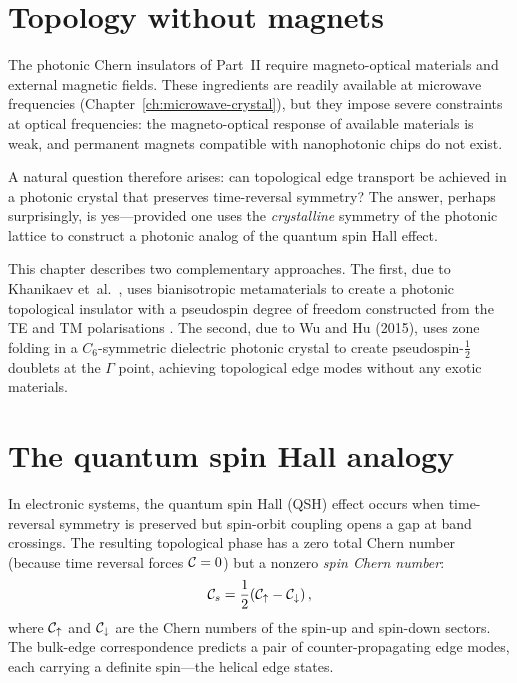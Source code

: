 
\section{Topology without magnets}
\label{sec:ch11-intro}

The photonic Chern insulators of Part~II require magneto-optical
materials and external magnetic fields.  These ingredients are readily
available at microwave frequencies (Chapter~\ref{ch:microwave-crystal}),
but they impose severe constraints at optical frequencies: the
magneto-optical response of available materials is weak, and permanent
magnets compatible with nanophotonic chips do not exist.

A natural question therefore arises: can topological edge transport be
achieved in a photonic crystal that preserves time-reversal symmetry?
The answer, perhaps surprisingly, is yes---provided one uses the
\emph{crystalline} symmetry of the photonic lattice to construct a
photonic analog of the quantum spin Hall effect.

This chapter describes two complementary approaches.  The first, due to
Khanikaev et~al.\ \cite{unknownphotonic,kane2005cond,bernevig2006quantum}, uses bianisotropic metamaterials to create a
photonic topological insulator with a pseudospin degree of freedom
constructed from the TE and TM polarisations
\cite{kang2018pseudo,chen2018valley,slobozhanyuk2015observation}.  The second, due to Wu and
Hu (2015), uses zone folding in a $C_6$-symmetric dielectric photonic
crystal to create pseudospin-$\frac{1}{2}$ doublets at the $\Gamma$
point, achieving topological edge modes without any exotic materials.

\section{The quantum spin Hall analogy}
\label{sec:ch11-qsh}

In electronic systems, the quantum spin Hall (QSH) effect occurs when
time-reversal symmetry is preserved but spin-orbit coupling opens a gap
at band crossings.  The resulting topological phase has a zero total
Chern number (because time reversal forces $\mathcal{C}=0$) but a nonzero
\emph{spin Chern number}:
\begin{equation}\label{eq:ch11-spin-chern}
  \mathcal{C}_s = \frac{1}{2}(\mathcal{C}_\uparrow - \mathcal{C}_\downarrow)\,,
\end{equation}
where $\mathcal{C}_\uparrow$ and $\mathcal{C}_\downarrow$ are the Chern numbers
of the spin-up and spin-down sectors.  The bulk-edge correspondence
predicts a pair of counter-propagating edge modes, each carrying a
definite spin---the helical edge states.

